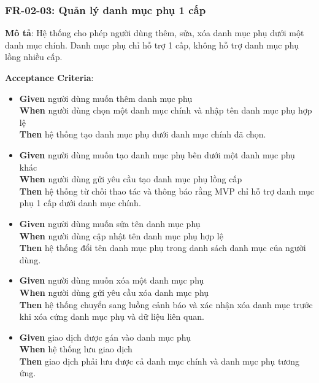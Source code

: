 \subsubsection{FR-02-03: Quản lý danh mục phụ 1 cấp}

\textbf{Mô tả}: Hệ thống cho phép người dùng thêm, sửa, xóa danh mục phụ dưới một danh mục chính. Danh mục phụ chỉ hỗ trợ 1 cấp, không hỗ trợ danh mục phụ lồng nhiều cấp.



\textbf{Acceptance Criteria}:

\begin{itemize}
\item \textbf{Given} người dùng muốn thêm danh mục phụ  \\ \hspace*{1.5em}  \textbf{When} người dùng chọn một danh mục chính và nhập tên danh mục phụ hợp lệ  \\ \hspace*{1.5em}  \textbf{Then} hệ thống tạo danh mục phụ dưới danh mục chính đã chọn.
\item \textbf{Given} người dùng muốn tạo danh mục phụ bên dưới một danh mục phụ khác  \\ \hspace*{1.5em}  \textbf{When} người dùng gửi yêu cầu tạo danh mục phụ lồng cấp  \\ \hspace*{1.5em}  \textbf{Then} hệ thống từ chối thao tác và thông báo rằng MVP chỉ hỗ trợ danh mục phụ 1 cấp dưới danh mục chính.
\item \textbf{Given} người dùng muốn sửa tên danh mục phụ  \\ \hspace*{1.5em}  \textbf{When} người dùng cập nhật tên danh mục phụ hợp lệ  \\ \hspace*{1.5em}  \textbf{Then} hệ thống đổi tên danh mục phụ trong danh sách danh mục của người dùng.
\item \textbf{Given} người dùng muốn xóa một danh mục phụ  \\ \hspace*{1.5em}  \textbf{When} người dùng gửi yêu cầu xóa danh mục phụ  \\ \hspace*{1.5em}  \textbf{Then} hệ thống chuyển sang luồng cảnh báo và xác nhận xóa danh mục trước khi xóa cứng danh mục phụ và dữ liệu liên quan.
\item \textbf{Given} giao dịch được gán vào danh mục phụ  \\ \hspace*{1.5em}  \textbf{When} hệ thống lưu giao dịch  \\ \hspace*{1.5em}  \textbf{Then} giao dịch phải lưu được cả danh mục chính và danh mục phụ tương ứng.

\end{itemize}
